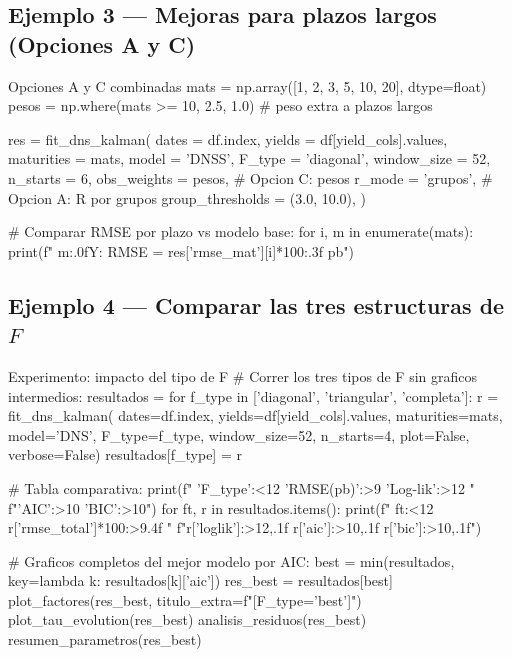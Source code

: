 \documentclass[12pt, a4paper]{article}
\theoremstyle{plain}
\theoremstyle{definition}
\theoremstyle{remark}
\begin{document}
\subsection{Ejemplo 3 --- Mejoras para plazos largos (Opciones A y C)}

\begin{codigocaja}{Opciones A y C combinadas}
mats   = np.array([1, 2, 3, 5, 10, 20], dtype=float)
pesos  = np.where(mats >= 10, 2.5, 1.0)  # peso extra a plazos largos

res = fit_dns_kalman(
    dates            = df.index,
    yields           = df[yield_cols].values,
    maturities       = mats,
    model            = 'DNSS',
    F_type           = 'diagonal',
    window_size      = 52,
    n_starts         = 6,
    obs_weights      = pesos,          # Opcion C: pesos
    r_mode           = 'grupos',       # Opcion A: R por grupos
    group_thresholds = (3.0, 10.0),
)

# Comparar RMSE por plazo vs modelo base:
for i, m in enumerate(mats):
    print(f"  {m:.0f}Y: RMSE = {res['rmse_mat'][i]*100:.3f} pb")
\end{codigocaja}

\subsection{Ejemplo 4 --- Comparar las tres estructuras de $F$}

\begin{codigocaja}{Experimento: impacto del tipo de F}
# Correr los tres tipos de F sin graficos intermedios:
resultados = {}
for f_type in ['diagonal', 'triangular', 'completa']:
    r = fit_dns_kalman(
        dates=df.index, yields=df[yield_cols].values,
        maturities=mats, model='DNS',
        F_type=f_type, window_size=52, n_starts=4,
        plot=False, verbose=False)
    resultados[f_type] = r

# Tabla comparativa:
print(f"  {'F_type':<12} {'RMSE(pb)':>9} {'Log-lik':>12} "
      f"{'AIC':>10} {'BIC':>10}")
for ft, r in resultados.items():
    print(f"  {ft:<12} {r['rmse_total']*100:>9.4f} "
          f"{r['loglik']:>12,.1f} {r['aic']:>10,.1f} {r['bic']:>10,.1f}")

# Graficos completos del mejor modelo por AIC:
best = min(resultados, key=lambda k: resultados[k]['aic'])
res_best = resultados[best]
plot_factores(res_best,    titulo_extra=f"[F_type='{best}']")
plot_tau_evolution(res_best)
analisis_residuos(res_best)
resumen_parametros(res_best)
\end{codigocaja}
\end{document}
